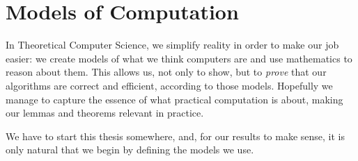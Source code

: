 \chapter{Models of Computation}%
\label{chapter:models-of-computation}

In Theoretical Computer Science, we simplify reality in order to make our job
easier: we create models of what we think computers are and use mathematics to
reason about them.
%
This allows us, not only to show, but to \emph{prove} that our algorithms are
correct and efficient, according to those models.
%
Hopefully we manage to capture the essence of what practical computation is
about, making our lemmas and theorems relevant in practice.

We have to start this thesis somewhere, and,
for our results to make sense,
it is only natural that we begin by defining the models we
use.



